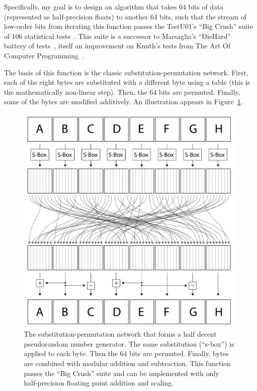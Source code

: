 \documentclass[twocolumn]{article}
\begin{document}
Specifically, my goal is to design an algorithm that takes 64 bits of
data (represented as half-precision floats) to another 64 bits, such
that the stream of low-order bits from iterating this function passes
the TestU01's ``Big Crush'' suite of 106 statistical
tests~\cite{lecuyer2007testu01}. This suite is a successor to
Marsaglia's ``DieHard'' battery of tests~\cite{marsaglia1996diehard},
itself an improvement on Knuth's tests from The Art Of Computer
Programming~\cite{knuth1997art}.

The basis of this function is the classic substitution-permutation
network. First, each of the eight bytes are substituted with a
different byte using a table (this is the mathematically non-linear
step). Then, the 64 bits are permuted. Finally, some of the bytes are
modified additively. An illustration appears in Figure~\ref{fig:cipher}.

\begin{figure}
\includegraphics[width=\linewidth]{cipher}
\caption{The substitution-permutation network that forms a half decent
  pseudorandom number generator. The same substitution (``s-box'') is
  applied to each byte. Then the 64 bits are permuted. Finally, bytes
  are combined with modular addition and subtraction. This function
  passes the ``Big Crush'' suite and can be implemented with only
  half-precision floating point addition and scaling.
} \label{fig:cipher}
\end{figure}
\end{document}
